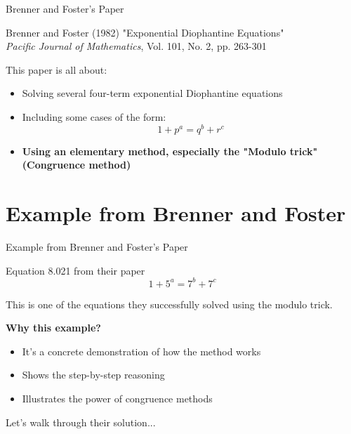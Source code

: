 ﻿\documentclass[10pt,aspectratio=169]{beamer}
\begin{document}
\begin{frame}{Brenner and Foster's Paper}
        \begin{block}{Brenner and Foster (1982)}
            "Exponential Diophantine Equations" \\
            \textit{Pacific Journal of Mathematics}, Vol. 101, No. 2, pp. 263-301
        \end{block}
        This paper is all about:
        \begin{itemize}
            \item Solving several four-term exponential Diophantine equations
            \item  Including some cases of the form:
            \[1+p^a = q^b + r^c\]
            \item \textbf{Using an elementary method, especially the "Modulo trick" (Congruence method)}
        \end{itemize}
\end{frame}

\section{Example from Brenner and Foster}

\begin{frame}{Example from Brenner and Foster's Paper}
    \begin{block}{Equation 8.021 from their paper}
        \[1 + 5^a = 7^b + 7^c\]
    \end{block}
    
    \vspace{0.3cm}
    This is one of the equations they successfully solved using the modulo trick.
    
    \textbf{Why this example?}
    \begin{itemize}
        \item It's a concrete demonstration of how the method works
        \item Shows the step-by-step reasoning
        \item Illustrates the power of congruence methods
    \end{itemize}
    
    \vspace{0.2cm}
    Let's walk through their solution...
\end{frame}
\end{document}
